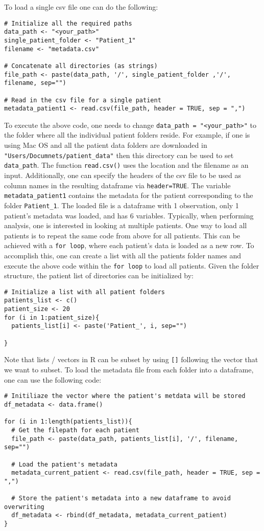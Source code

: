 To load a single csv file one can do the following:
\begin{lstlisting}
# Initialize all the required paths
data_path <- "<your_path>"
single_patient_folder <- "Patient_1"
filename <- "metadata.csv"

# Concatenate all directories (as strings)
file_path <- paste(data_path, '/', single_patient_folder ,'/', filename, sep="")

# Read in the csv file for a single patient
metadata_patient1 <- read.csv(file_path, header = TRUE, sep = ",")
\end{lstlisting}
To execute the above code, one needs to change \verb|data_path = "<your_path>"| to the folder where all the individual patient folders reside. For example, if one is using Mac OS and all the patient data folders are downloaded in \verb|"Users/Documnets/patient_data"| then this directory can be used to set \verb|data_path|.
The function \verb|read.csv()| uses the location and the filename as an input. Additionally, one can specify the headers of the csv file to be used as column names in the resulting dataframe via \verb|header=TRUE|. The variable \verb|metadata_patient1| contains the metadata for the patient corresponding to the folder \verb|Patient_1|. The loaded file is a dataframe with 1 observation, only 1 patient's metadata was loaded, and has 6 variables. Typically, when performing analysis, one is interested in looking at multiple patients. One way to load all patients is to repeat the same code from above for all patients. This can be achieved with a \verb|for loop|, where each patient's data is loaded as a new row. To accomplish this, one can create a list with all the patients folder names and execute the above code within the \verb|for loop| to load all patients. Given the folder structure, the patient list of directories can be initialized by:
\begin{lstlisting}
# Initialize a list with all patient folders
patients_list <- c()
patient_size <- 20
for (i in 1:patient_size){
  patients_list[i] <- paste('Patient_', i, sep="")

}
\end{lstlisting}
Note that lists / vectors in R can be subset by using \verb|[]| following the vector that we want to subset.
To load the metadata file from each folder into a dataframe, one can use the following code:
\begin{lstlisting}
# Initiliaze the vector where the patient's metdata will be stored
df_metadata <- data.frame()

for (i in 1:length(patients_list)){
  # Get the filepath for each patient
  file_path <- paste(data_path, patients_list[i], '/', filename, sep="")

  # Load the patient's metadata
  metadata_current_patient <- read.csv(file_path, header = TRUE, sep = ",")

  # Store the patient's metadata into a new dataframe to avoid overwriting
  df_metadata <- rbind(df_metadata, metadata_current_patient)
}
\end{lstlisting}
